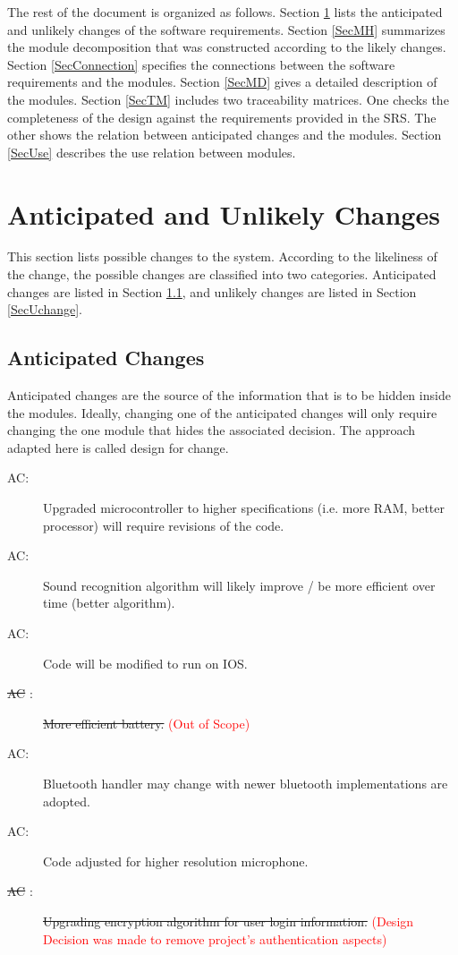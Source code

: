 \documentclass[12pt, titlepage]{article}
\newcounter{acnum}
\newcommand{\actheacnum}{AC\theacnum}
\begin{document}
\noindent The rest of the document is organized as follows. Section
\ref{SecChange} lists the anticipated and unlikely changes of the software
requirements. Section \ref{SecMH} summarizes the module decomposition that
was constructed according to the likely changes. Section \ref{SecConnection}
specifies the connections between the software requirements and the
modules. Section \ref{SecMD} gives a detailed description of the
modules. Section \ref{SecTM} includes two traceability matrices. One checks
the completeness of the design against the requirements provided in the SRS. The
other shows the relation between anticipated changes and the modules. Section
\ref{SecUse} describes the use relation between modules.

\section{Anticipated and Unlikely Changes} \label{SecChange}

This section lists possible changes to the system. According to the likeliness
of the change, the possible changes are classified into two
categories. Anticipated changes are listed in Section \ref{SecAchange}, and
unlikely changes are listed in Section \ref{SecUchange}.

\subsection{Anticipated Changes} \label{SecAchange}

Anticipated changes are the source of the information that is to be hidden
inside the modules. Ideally, changing one of the anticipated changes will only
require changing the one module that hides the associated decision. The approach
adapted here is called design for
change.

\begin{description}
\item[ \actheacnum \label{ac1}:] Upgraded microcontroller to higher specifications (i.e. more RAM, better processor) will require revisions of the code.
\item[ \actheacnum \label{ac2}:] Sound recognition algorithm will likely improve / be more efficient over time (better algorithm).
\item[ \actheacnum \label{ac3}:] Code will be modified to run on IOS.
\item[ \sout{\actheacnum} \label{ac4}:] \sout{More efficient battery.} \textcolor{red}{(Out of Scope)}
\item[ \actheacnum \label{ac5}:] Bluetooth handler may change with newer bluetooth implementations are adopted.
\item[ \actheacnum \label{ac6}:] Code adjusted for higher resolution microphone.
\item[ \sout{\actheacnum} \label{ac7}:] \sout{Upgrading encryption algorithm for user login information.} \textcolor{red}{(Design Decision was made to remove project's authentication aspects)}
\end{description}
\end{document}
